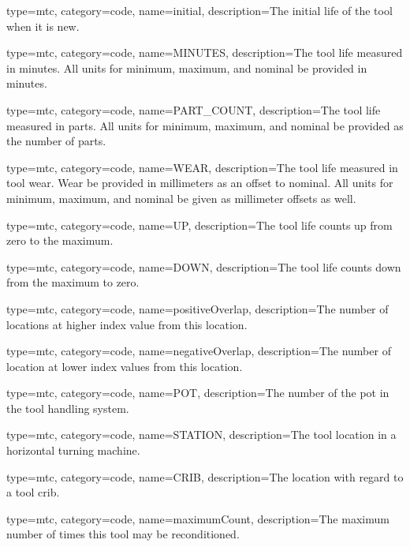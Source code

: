 {
  type=mtc,
  category=code,
  name={initial},
  description={The initial life of the tool when it is new.}
}


{
  type=mtc,
  category=code,
  name={MINUTES},
  description={The tool life measured in minutes. All units for minimum, maximum, and nominal \MUST be provided in minutes.}
}


{
  type=mtc,
  category=code,
  name={PART\_COUNT},
  description={The tool life measured in parts. All units for minimum, maximum, and nominal \MUST be provided as the number of parts.}
}


{
  type=mtc,
  category=code,
  name={WEAR},
  description={The tool life measured in tool wear. Wear \MUST be provided in millimeters as an offset to nominal. All units for minimum, maximum, and nominal \MUST be given as millimeter offsets as well. }
}


{
  type=mtc,
  category=code,
  name={UP},
  description={The tool life counts up from zero to the maximum.}
}


{
  type=mtc,
  category=code,
  name={DOWN},
  description={The tool life counts down from the maximum to zero.}
}


{
  type=mtc,
  category=code,
  name={positiveOverlap},
  description={The number of locations at higher index value from this location.}
}


{
  type=mtc,
  category=code,
  name={negativeOverlap},
  description={The number of location at lower index values from this location.}
}


{
  type=mtc,
  category=code,
  name={POT},
  description={The number of the pot in the tool handling system.}
}


{
  type=mtc,
  category=code,
  name={STATION},
  description={The tool location in a horizontal turning machine.}
}


{
  type=mtc,
  category=code,
  name={CRIB},
  description={The location with regard to a tool crib.}
}


{
  type=mtc,
  category=code,
  name={maximumCount},
  description={The maximum number of times this tool may be reconditioned.}
}


